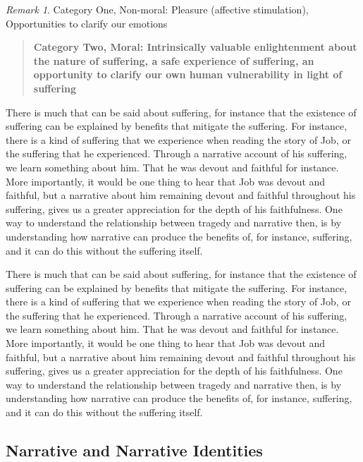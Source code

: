 \documentclass[
  letterpaper,
  DIV=11,
  numbers=noendperiod]{scrartcl}
\theoremstyle{remark}
\newtheorem*{remark}{Remark}
\begin{document}
\begin{remark}
Category One, Non-moral: Pleasure (affective stimulation), Opportunities
to clarify our emotions

\begin{quote}
\textbf{Category Two, Moral: Intrinsically valuable enlightenment about
the nature of suffering, a safe experience of suffering, an opportunity
to clarify our own human vulnerability in light of suffering}
\end{quote}

\end{remark}

There is much that can be said about suffering, for instance that the
existence of suffering can be explained by benefits that mitigate the
suffering. For instance, there is a kind of suffering that we experience
when reading the story of Job, or the suffering that he experienced.
Through a narrative account of his suffering, we learn something about
him. That he was devout and faithful for instance. More importantly, it
would be one thing to hear that Job was devout and faithful, but a
narrative about him remaining devout and faithful throughout his
suffering, gives us a greater appreciation for the depth of his
faithfulness. One way to understand the relationship between tragedy and
narrative then, is by understanding how narrative can produce the
benefits of, for instance, suffering, and it can do this without the
suffering itself.

There is much that can be said about suffering, for instance that the
existence of suffering can be explained by benefits that mitigate the
suffering. For instance, there is a kind of suffering that we experience
when reading the story of Job, or the suffering that he experienced.
Through a narrative account of his suffering, we learn something about
him. That he was devout and faithful for instance. More importantly, it
would be one thing to hear that Job was devout and faithful, but a
narrative about him remaining devout and faithful throughout his
suffering, gives us a greater appreciation for the depth of his
faithfulness. One way to understand the relationship between tragedy and
narrative then, is by understanding how narrative can produce the
benefits of, for instance, suffering, and it can do this without the
suffering itself.

\subsection{Narrative and Narrative
Identities}\label{narrative-and-narrative-identities}
\end{document}
